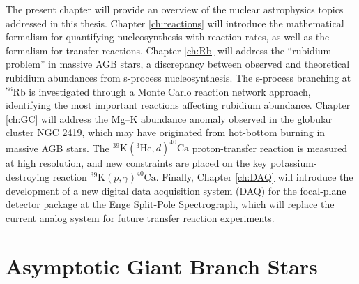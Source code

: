 The present chapter will provide an overview of the nuclear astrophysics topics addressed in this thesis. Chapter \ref{ch:reactions} will introduce the mathematical formalism for quantifying nucleosynthesis with reaction rates, as well as the formalism for transfer reactions. Chapter \ref{ch:Rb} will address the ``rubidium problem'' in massive AGB stars, a discrepancy between observed and theoretical rubidium abundances from s-process nucleosynthesis. The s-process branching at $^{86}$Rb is investigated through a Monte Carlo reaction network approach, identifying the most important reactions affecting rubidium abundance.
Chapter \ref{ch:GC} will address the Mg--K abundance anomaly observed in the globular cluster NGC 2419, which may have originated from hot-bottom burning in massive AGB stars. The $^{39}\mathrm{K}(^{3}\mathrm{He},d)^{40}\mathrm{Ca}$ proton-transfer reaction is measured at high resolution, and new constraints are placed on the key potassium-destroying reaction $^{39}\mathrm{K}(p,\gamma)^{40}\mathrm{Ca}$. Finally, Chapter \ref{ch:DAQ} will introduce the development of a new digital data acquisition system (DAQ) for the focal-plane detector package at the Enge Split-Pole Spectrograph, which will replace the current analog system for future transfer reaction experiments.


\section{Asymptotic Giant Branch Stars}

